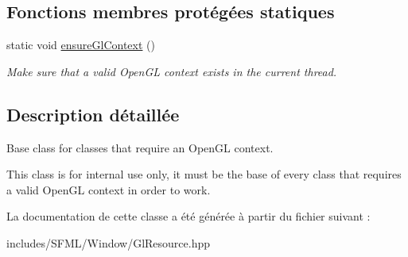 \subsection*{Fonctions membres protégées statiques}
\begin{DoxyCompactItemize}
\item 
\mbox{\label{classsf_1_1GlResource_ae0efa7935241644608ca32ba47b22a33}} 
static void \hyperlink{classsf_1_1GlResource_ae0efa7935241644608ca32ba47b22a33}{ensure\+Gl\+Context} ()
\begin{DoxyCompactList}\small\item\em Make sure that a valid Open\+GL context exists in the current thread. \end{DoxyCompactList}\end{DoxyCompactItemize}


\subsection{Description détaillée}
Base class for classes that require an Open\+GL context. 

This class is for internal use only, it must be the base of every class that requires a valid Open\+GL context in order to work. 

La documentation de cette classe a été générée à partir du fichier suivant \+:\begin{DoxyCompactItemize}
\item 
includes/\+S\+F\+M\+L/\+Window/Gl\+Resource.\+hpp\end{DoxyCompactItemize}
